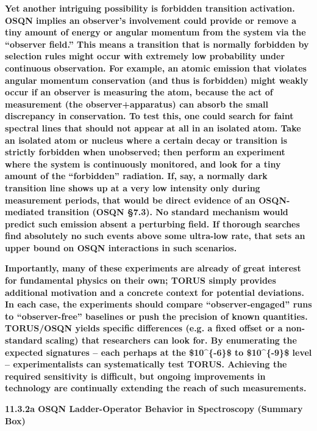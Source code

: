 \documentclass[
]{article}
\begin{document}
\textbf{Yet another intriguing possibility is forbidden transition
activation. OSQN implies an observer's involvement could provide or
remove a tiny amount of energy or angular momentum from the system via
the ``observer field.'' This means a transition that is normally
forbidden by selection rules might occur with extremely low probability
under continuous observation. For example, an atomic emission that
violates angular momentum conservation (and thus is forbidden) might
weakly occur if an observer is measuring the atom, because the act of
measurement (the observer+apparatus) can absorb the small discrepancy in
conservation. To test this, one could search for faint spectral lines
that should not appear at all in an isolated atom. Take an isolated atom
or nucleus where a certain decay or transition is strictly forbidden
when unobserved; then perform an experiment where the system is
continuously monitored, and look for a tiny amount of the ``forbidden''
radiation. If, say, a normally dark transition line shows up at a very
low intensity only during measurement periods, that would be direct
evidence of an OSQN-mediated transition (OSQN §7.3). No standard
mechanism would predict such emission absent a perturbing field. If
thorough searches find absolutely no such events above some ultra-low
rate, that sets an upper bound on OSQN interactions in such scenarios.}

\textbf{Importantly, many of these experiments are already of great
interest for fundamental physics on their own; TORUS simply provides
additional motivation and a concrete context for potential deviations.
In each case, the experiments should compare ``observer-engaged'' runs
to ``observer-free'' baselines or push the precision of known
quantities. TORUS/OSQN yields specific differences (e.g. a fixed offset
or a non-standard scaling) that researchers can look for. By enumerating
the expected signatures -- each perhaps at the \$10\^{}\{-6\}\$ to
\$10\^{}\{-9\}\$ level -- experimentalists can systematically test
TORUS. Achieving the required sensitivity is difficult, but ongoing
improvements in technology are continually extending the reach of such
measurements.}

\textbf{11.3.2a OSQN Ladder-Operator Behavior in Spectroscopy (Summary
Box)}
\end{document}
